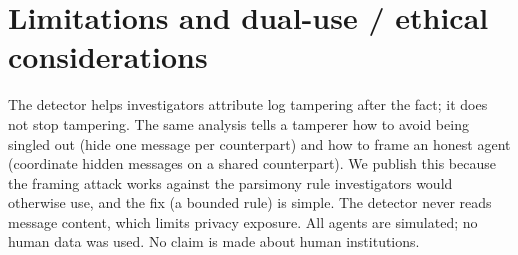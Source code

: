 \documentclass[10pt]{article}
\begin{document}
\appendix
\section{Limitations and dual-use / ethical considerations}
The detector helps investigators attribute log tampering after the fact; it does not stop tampering. The same
analysis tells a tamperer how to avoid being singled out (hide one message per counterpart) and how to frame an
honest agent (coordinate hidden messages on a shared counterpart). We publish this because the framing attack
works against the parsimony rule investigators would otherwise use, and the fix (a bounded rule) is simple. The
detector never reads message content, which limits privacy exposure. All agents are simulated; no human data
was used. No claim is made about human institutions.
\end{document}
